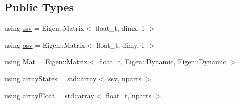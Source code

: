\subsection*{Public Types}
\begin{DoxyCompactItemize}
\item 
using \hyperlink{classBSFilter_a0b5bc93957fb6b6b1282f31fa2e01c3c}{ssv} = Eigen\+::\+Matrix$<$ float\+\_\+t, dimx, 1 $>$
\item 
using \hyperlink{classBSFilter_ad8512328484d7c7bd7a3b7a9481d7f37}{osv} = Eigen\+::\+Matrix$<$ float\+\_\+t, dimy, 1 $>$
\item 
using \hyperlink{classBSFilter_a8ec8e8477e12686e706e7d7aa5c2971c}{Mat} = Eigen\+::\+Matrix$<$ float\+\_\+t, Eigen\+::\+Dynamic, Eigen\+::\+Dynamic $>$
\item 
using \hyperlink{classBSFilter_a0afe61a08de8d178647b23beae9eef16}{array\+States} = std\+::array$<$ \hyperlink{classBSFilter_a0b5bc93957fb6b6b1282f31fa2e01c3c}{ssv}, nparts $>$
\item 
using \hyperlink{classBSFilter_a14a572439ddfe7d2b4157d4c91617981}{array\+Float} = std\+::array$<$ float\+\_\+t, nparts $>$
\end{DoxyCompactItemize}
